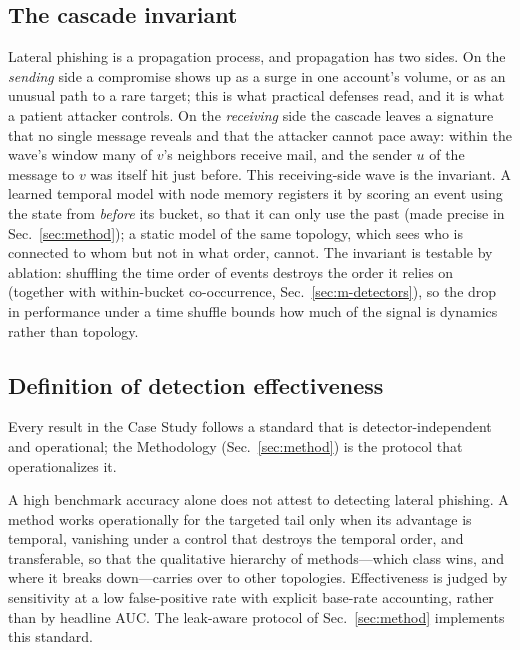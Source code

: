 \subsection{The cascade invariant}
\label{sec:invariant}
Lateral phishing is a propagation process, and propagation has two sides. On the \emph{sending} side a
compromise shows up as a surge in one account's volume, or as an unusual path to a rare target; this is what
practical defenses read, and it is what a patient attacker controls. On the \emph{receiving} side the cascade
leaves a signature that no single message reveals and that the attacker cannot pace away: within the wave's
window many of $v$'s neighbors receive mail, and the sender $u$ of the message to $v$ was itself hit just
before. This receiving-side wave is the invariant. A learned temporal model with node memory registers it by
scoring an event using the state from \emph{before} its bucket, so that it can only use the past (made precise
in Sec.~\ref{sec:method}); a static model of the same topology, which sees who is connected to whom but not
in what order, cannot. The invariant is testable by ablation: shuffling the time order of events destroys
the order it relies on (together with within-bucket co-occurrence, Sec.~\ref{sec:m-detectors}), so the drop in
performance under a time shuffle bounds how much of the signal is dynamics rather than topology.

\subsection{Definition of detection effectiveness}
\label{sec:effectiveness}
Every result in the Case Study follows a standard that is detector-independent and operational; the
Methodology (Sec.~\ref{sec:method}) is the protocol that operationalizes it.

A high benchmark accuracy alone does not attest to detecting lateral phishing. A method works operationally
for the targeted tail only when its advantage is temporal, vanishing under a control that destroys the
temporal order, and transferable, so that the qualitative hierarchy of methods---which class wins, and where it
breaks down---carries over to other topologies. Effectiveness is judged by sensitivity at a low
false-positive rate with explicit base-rate accounting, rather than by headline AUC. The leak-aware protocol of
Sec.~\ref{sec:method} implements this standard.
